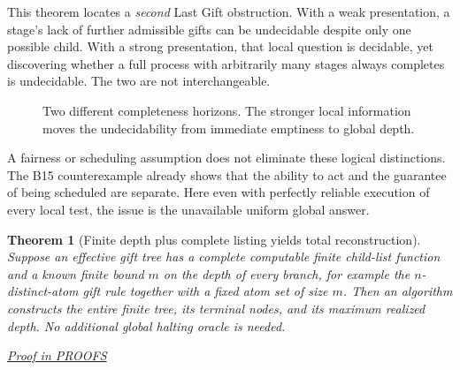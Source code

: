 \documentclass[11pt,letterpaper]{article}
\newtheorem{theorem}{Theorem}[section]
\theoremstyle{definition}\newtheorem{definition}[theorem]{Definition}\newtheorem{example}[theorem]{Example}
\theoremstyle{remark}\newtheorem{remark}[theorem]{Remark}
\newcommand{\prooflink}[1]{\par\noindent\hfill\small\hyperref[#1]{\textit{Proof in PROOFS}}\normalsize}
\begin{document}
This theorem locates a \emph{second} Last Gift obstruction. With a weak presentation, a stage's lack of further admissible gifts can be undecidable despite only one possible child. With a strong presentation, that local question is decidable, yet discovering whether a full process with arbitrarily many stages always completes is undecidable. The two are not interchangeable.

\begin{figure}[htbp]\centering\small
{}
\caption{Two different completeness horizons. The stronger local information moves the undecidability from immediate emptiness to global depth.}
\end{figure}

A fairness or scheduling assumption does not eliminate these logical distinctions. The B15 counterexample already shows that the ability to act and the guarantee of being scheduled are separate. Here even with perfectly reliable execution of every local test, the issue is the unavailable uniform global answer.

\begin{theorem}[Finite depth plus complete listing yields total reconstruction]\label{w3:th:cap}
Suppose an effective gift tree has a complete computable finite child-list function and a known finite bound $m$ on the depth of every branch, for example the $n$-distinct-atom gift rule together with a fixed atom set of size $m$. Then an algorithm constructs the entire finite tree, its terminal nodes, and its maximum realized depth. No additional global halting oracle is needed.
\prooflink{w3:pr:cap}
\end{theorem}
\end{document}
